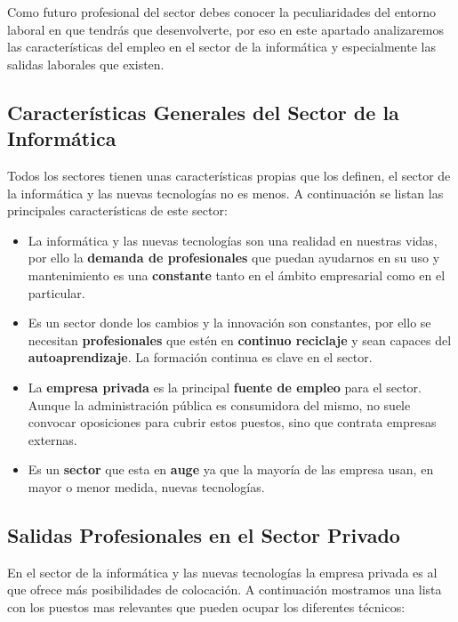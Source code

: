 Como futuro profesional del sector debes conocer la peculiaridades del entorno laboral en que tendrás que desenvolverte, por eso en este apartado analizaremos las características del empleo en el sector de la informática y especialmente las salidas laborales que existen.

\subsection{Características Generales del Sector de la Informática}
Todos los sectores tienen unas características propias que los definen, el sector de la informática y las nuevas tecnologías no es menos. A continuación se listan las principales características de este sector:

\begin{itemize}
    \item La informática y las nuevas tecnologías son una realidad en nuestras vidas, por ello la \textbf{demanda de profesionales} que puedan ayudarnos en su uso y mantenimiento es una \textbf{constante} tanto en el ámbito empresarial como en el particular.
    \item Es un sector donde los cambios y la innovación son constantes, por ello se necesitan \textbf{profesionales} que estén en \textbf{continuo reciclaje} y sean capaces del \textbf{autoaprendizaje}. La formación continua es clave en el sector.
    \item La \textbf{empresa privada} es la principal \textbf{fuente de empleo} para el sector. Aunque la administración pública es consumidora del mismo, no suele convocar oposiciones para cubrir estos puestos, sino que contrata empresas externas.
    \item Es un \textbf{sector} que esta en \textbf{auge} ya que la mayoría de las empresa usan, en mayor o menor medida, nuevas tecnologías.
\end{itemize}

\subsection{Salidas Profesionales en el Sector Privado}
En el sector de la informática y las nuevas tecnologías la empresa privada es al que ofrece más posibilidades de colocación. A continuación mostramos una lista con los puestos mas relevantes que pueden ocupar los diferentes técnicos:

